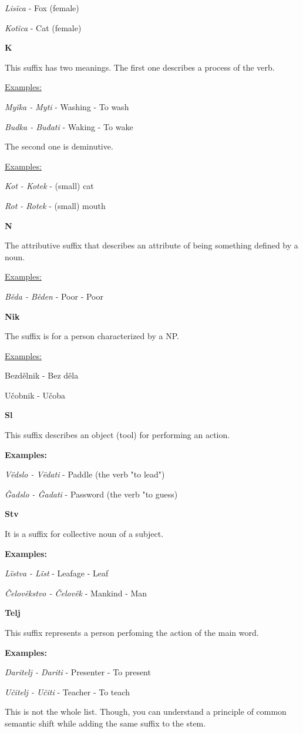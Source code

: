 \textit{Lisïca} - Fox (female)

\textit{Kotïca} - Cat (female)

\textbf{K}

This suffix has two meanings. The first one describes a process of the verb. 

\underline{Examples:}

\textit{Myǐka - Myti} - Washing - To wash

\textit{Budka - Buđati} - Waking - To wake

The second one is deminutive.

\underline{Examples:}

\textit{Kot - Kotek} - (small) cat

\textit{Rot - Rotek} - (small) mouth

\textbf{N}

The attributive suffix that describes an attribute of being something defined by a noun.

\underline{Examples:}

\textit{Běda - Běden} - Poor - Poor

\textbf{Nik}

The suffix is for a person characterized by a NP.

\underline{Examples:}

Bezdělnik - Bez děla

Učobnik - Učoba

\textbf{Sl}

This suffix describes an object (tool) for performing an action.

\textbf{Examples:}

\textit{Vëdslo - Vëdati} - Paddle (the verb "to lead")

\textit{Ĝadslo - Ĝadati} - Password (the verb "to guess)

\textbf{Stv}

It is a suffix for collective noun of a subject.

\textbf{Examples:}

\textit{Lïstva - Lïst} - Leafage - Leaf

\textit{Čelověkstvo - Čelověk} - Mankind - Man

\textbf{Telj}

This suffix represents a person perfoming the action of the main word.

\textbf{Examples:}

\textit{Daritelj - Dariti} - Presenter - To present

\textit{Učitelj - Učiti} - Teacher - To teach

This is not the whole list. Though, you can understand a principle of common semantic shift while adding the same suffix to the stem.
